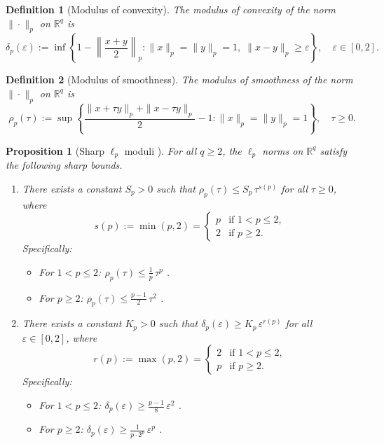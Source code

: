 \documentclass[11pt]{article}
\newtheorem{proposition}[theorem]{Proposition}
\newtheorem{definition}{Definition}
\newcommand{\R}{\mathbb{R}}
\begin{document}
\begin{definition}[Modulus of convexity]\label{def:mod-convexity}
The \emph{modulus of convexity} of the norm $\|\cdot\|_p$ on $\R^q$ is
\[
\delta_p(\varepsilon) := \inf\left\{ 1 - \left\|\frac{x+y}{2}\right\|_p : \|x\|_p = \|y\|_p = 1,\; \|x-y\|_p \ge \varepsilon \right\}, \quad \varepsilon \in [0, 2].
\]
\end{definition}

\begin{definition}[Modulus of smoothness]\label{def:mod-smoothness}
The \emph{modulus of smoothness} of the norm $\|\cdot\|_p$ on $\R^q$ is
\[
\rho_p(\tau) := \sup\left\{ \frac{\|x+\tau y\|_p + \|x-\tau y\|_p}{2} - 1 : \|x\|_p = \|y\|_p = 1 \right\}, \quad \tau \ge 0.
\]
\end{definition}

\begin{proposition}[Sharp $\ell_p$ moduli {\cite{Hanner1956,Ball1994}}]\label{prop:lp-moduli}
For all $q \ge 2$, the $\ell_p$ norms on $\R^q$ satisfy the following sharp bounds.
\begin{enumerate}
\item There exists a constant $S_p > 0$ such that $\rho_p(\tau) \le S_p \, \tau^{s(p)}$ for all $\tau \ge 0$, where
\begin{equation}\label{eq:smoothness-power}
s(p) := \min(p, 2) = \begin{cases} p & \text{if } 1 < p \le 2, \\ 2 & \text{if } p \ge 2. \end{cases}
\end{equation}
Specifically:
\begin{itemize}
\item For $1 < p \le 2$: $\rho_p(\tau) \le \frac{1}{p}\,\tau^p$ \;\cite{Hanner1956}.
\item For $p \ge 2$: $\rho_p(\tau) \le \frac{p-1}{2}\,\tau^2$ \;\cite{Ball1994}.
\end{itemize}
\item There exists a constant $K_p > 0$ such that $\delta_p(\varepsilon) \ge K_p\, \varepsilon^{r(p)}$ for all $\varepsilon \in [0, 2]$, where
\begin{equation}\label{eq:convexity-power}
r(p) := \max(p, 2) = \begin{cases} 2 & \text{if } 1 < p \le 2, \\ p & \text{if } p \ge 2. \end{cases}
\end{equation}
Specifically:
\begin{itemize}
\item For $1 < p \le 2$: $\delta_p(\varepsilon) \ge \frac{p-1}{8}\,\varepsilon^2$ \;\cite{Hanner1956,Clarkson1936}.
\item For $p \ge 2$: $\delta_p(\varepsilon) \ge \frac{1}{p\cdot 2^p}\,\varepsilon^p$ \;\cite{Hanner1956}.
\end{itemize}
\end{enumerate}
\end{proposition}
\end{document}
